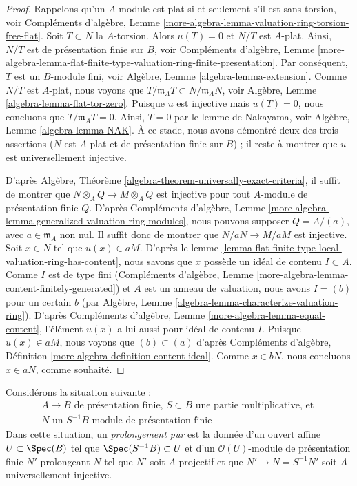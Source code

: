 \begin{proof}
Rappelons qu'un $A$-module est plat si et seulement s'il est sans torsion, voir
Compléments d'algèbre, Lemme
\ref{more-algebra-lemma-valuation-ring-torsion-free-flat}.
Soit $T \subset N$ la $A$-torsion. Alors $u(T) = 0$ et
$N/T$ est $A$-plat. Ainsi, $N/T$ est de présentation finie sur $B$, voir
Compléments d'algèbre, Lemme
\ref{more-algebra-lemma-flat-finite-type-valuation-ring-finite-presentation}.
Par conséquent, $T$ est un $B$-module fini, voir
Algèbre, Lemme \ref{algebra-lemma-extension}.
Comme $N/T$ est $A$-plat, nous voyons que
$T/\mathfrak m_A T \subset N/\mathfrak m_A N$, voir
Algèbre, Lemme \ref{algebra-lemma-flat-tor-zero}.
Puisque $\overline{u}$ est injective mais $u(T) = 0$, nous concluons que
$T/\mathfrak m_A T = 0$. Ainsi, $T = 0$ par le lemme de Nakayama, voir
Algèbre, Lemme \ref{algebra-lemma-NAK}. À ce stade, nous avons
démontré deux des trois assertions ($N$ est $A$-plat et
de présentation finie sur $B$) ; il reste à montrer que
$u$ est universellement injective.

\medskip\noindent
D'après Algèbre, Théorème \ref{algebra-theorem-universally-exact-criteria},
il suffit de montrer que $N \otimes_A Q \to M \otimes_A Q$ est injective
pour tout $A$-module de présentation finie $Q$. D'après
Compléments d'algèbre, Lemme
\ref{more-algebra-lemma-generalized-valuation-ring-modules},
nous pouvons supposer $Q = A/(a)$, avec $a \in \mathfrak m_A$ non nul.
Il suffit donc de montrer que $N/aN \to M/aM$ est injective.
Soit $x \in N$ tel que $u(x) \in aM$. D'après le
lemme \ref{lemma-flat-finite-type-local-valuation-ring-has-content},
nous savons que $x$ possède un idéal de contenu $I \subset A$. Comme
$I$ est de type fini
(Compléments d'algèbre, Lemme \ref{more-algebra-lemma-content-finitely-generated})
et $A$ est un anneau de valuation, nous avons $I = (b)$ pour un certain $b$
(par Algèbre, Lemme \ref{algebra-lemma-characterize-valuation-ring}).
D'après Compléments d'algèbre, Lemme \ref{more-algebra-lemma-equal-content},
l'élément $u(x)$ a lui aussi pour idéal de contenu $I$.
Puisque $u(x) \in aM$, nous voyons que $(b) \subset (a)$
d'après Compléments d'algèbre, Définition \ref{more-algebra-definition-content-ideal}.
Comme $x \in bN$, nous concluons $x \in aN$, comme souhaité.
\end{proof}

\noindent
Considérons la situation suivante :
\begin{equation}
\label{equation-star}
\begin{matrix}
A \to B\text{ de présentation finie, }S \subset B
\text{ une partie multiplicative, et }\\
N\text{ un }S^{-1}B\text{-module de présentation finie}
\end{matrix}
\end{equation}
Dans cette situation, un {\it prolongement pur} est la donnée d'un ouvert affine
$U \subset \Spec(B)$ tel que $\Spec(S^{-1}B) \subset U$ et d'un
$\mathcal{O}(U)$-module de présentation finie $N'$ prolongeant $N$
tel que $N'$ soit $A$-projectif et que $N' \to N = S^{-1}N'$
soit $A$-universellement injective.

